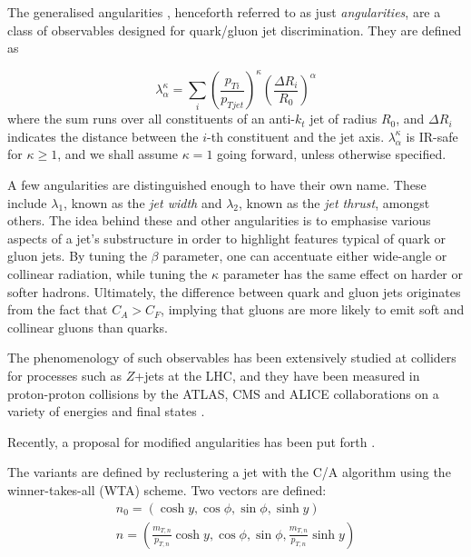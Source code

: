 \documentclass[10pt,a4paper]{book}
\begin{document}
The generalised angularities \cite{Larkoski:2014pca, Proceedings:2018jsb, Gras:2017jty}, henceforth referred to as just \emph{angularities}, are a class of observables designed for quark/gluon jet discrimination. They are defined as 

\begin{equation}
\lambda^\kappa_\alpha = \sum_i \left(\frac{p_{Ti}}{p_{Tjet}}\right)^\kappa \left(\frac{\Delta R_i}{R_0} \right)^\alpha
\end{equation} 
where the sum runs over all constituents of an anti-$k_t$ jet of radius $R_0$, and $\Delta R_i$ indicates the distance between the $i$-th constituent and the jet axis. $\lambda^\kappa_\alpha$ is IR-safe for $\kappa \geq 1$, and we shall assume $\kappa = 1$ going forward, unless otherwise specified.

A few angularities are distinguished enough to have their own name. These include $\lambda_1$, known as the \emph{jet width} and $\lambda_2$, known as the \emph{jet thrust}, amongst others. The idea behind these and other angularities is to emphasise various aspects of a jet's substructure in order to highlight features typical of quark or gluon jets. By tuning the $\beta$ parameter, one can accentuate either wide-angle or collinear radiation, while tuning the $\kappa$ parameter has the same effect on harder or softer hadrons. Ultimately, the difference between quark and gluon jets originates from the fact that $C_A > C_F$, implying that gluons are more likely to emit soft and collinear gluons than quarks.

The phenomenology of such observables has been extensively studied at colliders for processes such as $Z$+jets \cite{Reichelt:2021svh} at the LHC, and they have been measured in proton-proton collisions by the ATLAS, CMS and ALICE collaborations on a variety of energies and final states \cite{ATLAS:2019kwg, CMS:2021vsp, ALICE:2021njq, Dhankher:2024rkv}.

Recently, a proposal for modified angularities has been put forth \cite{Dhani:2024gtx}. 

The variants are defined by reclustering a jet with the C/A algorithm using the winner-takes-all (WTA) scheme. Two vectors are defined:
\begin{gather}
n_0 = \left(\cosh y, \cos \phi, \sin \phi, \sinh y \right) \\
n = \left(\frac{m_{T, n}}{p_{T, n}} \cosh y, \cos \phi, \sin \phi, \frac{m_{T, n}}{p_{T, n}}\sinh y \right)
\end{gather}
\end{document}
